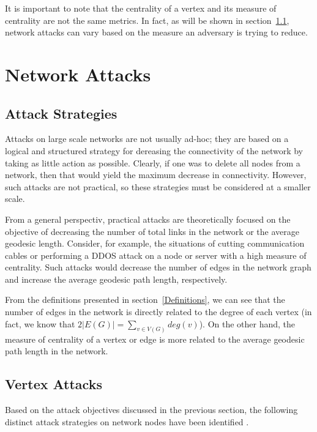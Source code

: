 \documentclass[11pt]{article}
\begin{document}
It is important to note that the centrality of a vertex and its measure of centrality are not the same metrics. In fact, as will be shown in section~\ref{AttackStrategies}, network attacks can vary based on the measure an adversary is trying to reduce. 

\section{Network Attacks}



\subsection{Attack Strategies}
\label{AttackStrategies}
Attacks on large scale networks are not usually ad-hoc; they are based on a logical and structured strategy for dereasing the connectivity of the network by taking as little action as possible. Clearly, if one was to delete all nodes from a network, then that would yield the maximum decrease in connectivity. However, such attacks are not practical, so these strategies must be considered at a smaller scale. 

From a general perspectiv, practical attacks are theoretically focused on the objective of decreasing the number of total links in the network or the average geodesic length. Consider, for example, the situations of cutting communication cables or performing a DDOS attack on a node or server with a high measure of centrality. Such attacks would decrease the number of edges in the network graph and increase the average geodesic path length, respectively. 

From the definitions presented in section~\ref{Definitions}, we can see that the number of edges in the network is directly related to the degree of each vertex (in fact, we know that $2|E(G)| =\sum_{v \in V(G)}deg(v)$). On the other hand, the measure of centrality of a vertex or edge is more related to the average geodesic path length in the network. 

\subsection{Vertex Attacks}
Based on the attack objectives discussed in the previous section, the following distinct attack strategies on network nodes have been identified \cite{ATTACKS}.
\end{document}
